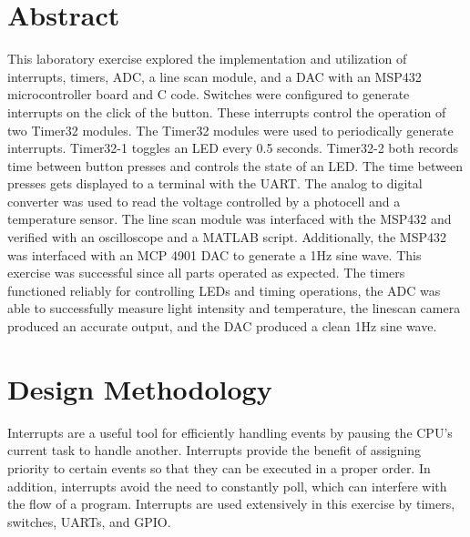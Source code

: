 \documentclass[CMPE]{KGCOEReport}
\begin{document}
\maketitle

\section*{Abstract}

This laboratory exercise explored the implementation and utilization of interrupts, timers, ADC, a line scan module, and a DAC with an MSP432 microcontroller board and C code. Switches were configured to generate interrupts on the click of the button. These interrupts control the operation of two Timer32 modules. The Timer32 modules were used to periodically generate interrupts. Timer32-1 toggles an LED every 0.5 seconds. Timer32-2 both records time between button presses and controls the state of an LED. The time between presses gets displayed to a terminal with the UART. The analog to digital converter was used to read the voltage controlled by a photocell and a temperature sensor. The line scan module was interfaced with the MSP432 and verified with an oscilloscope and a MATLAB script. Additionally, the MSP432 was interfaced with an MCP 4901 DAC to generate a 1Hz sine wave. This exercise was successful since all parts operated as expected. The timers functioned reliably for controlling LEDs and timing operations, the ADC was able to successfully measure light intensity and temperature, the linescan camera produced an accurate output, and the DAC produced a clean 1Hz sine wave.

\section*{Design Methodology}

Interrupts are a useful tool for efficiently handling events by pausing the CPU's current task to handle another. Interrupts provide the benefit of assigning priority to certain events so that they can be executed in a proper order. In addition, interrupts avoid the need to constantly poll, which can interfere with the flow of a program. Interrupts are used extensively in this exercise by timers, switches, UARTs, and GPIO.\\
\end{document}
